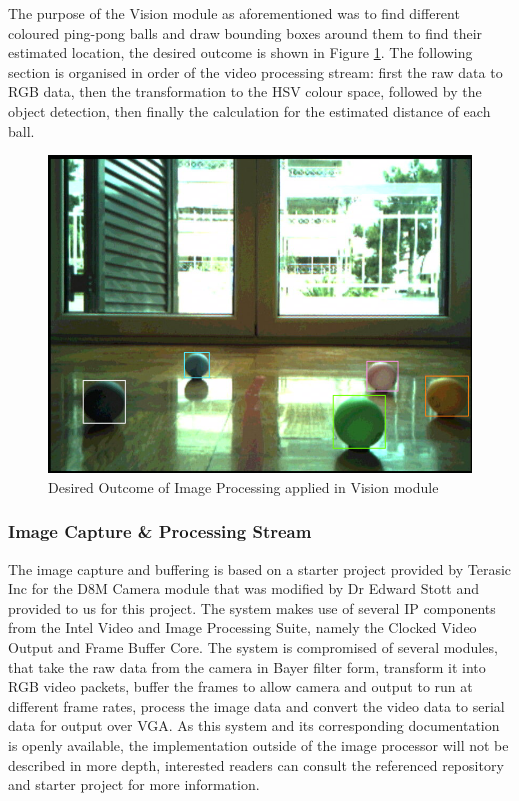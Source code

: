 \documentclass[a4paper]{article}
\begin{document}
The purpose of the Vision module as aforementioned was to find different coloured
ping-pong balls and draw bounding boxes around them to find their estimated location, 
the desired outcome is shown in Figure \ref{fig:DesiredVisionResult}. The following 
section is organised in order of the video processing stream: first the raw data to 
RGB data, then the transformation to the HSV colour space, followed by the object 
detection, then finally the calculation for the estimated distance of each ball. 

\begin{figure}[H]
	\begin{Center}
		\includegraphics[scale = 0.5]{./images/AnnotatedBalls.png}
		\caption{Desired Outcome of Image Processing applied in Vision module }
		\label{fig:DesiredVisionResult}
	\end{Center}
\end{figure}



 

\subsubsection{Image Capture \& Processing Stream}

The image capture and buffering is based on a starter project provided
by Terasic Inc for the D8M Camera module that was modified by Dr Edward Stott 
\cite{EEE2Rover} and provided to us for this project. The system makes use of 
several IP components from the Intel Video and Image Processing Suite,
namely the Clocked Video Output and Frame Buffer Core. The system is compromised
of several modules, that take the raw data from the camera in Bayer filter form\cite{TerasicD8MWeb},
transform it into RGB video packets, buffer the frames to allow camera and output
to run at different frame rates, process the image data and convert the video 
data to serial data for output over VGA.\cite{EEE2Rover} As this system and its 
corresponding documentation is openly available, the implementation outside of 
the image processor will not be described in more depth, interested readers can 
consult the referenced repository and starter project for more information. 
\end{document}
